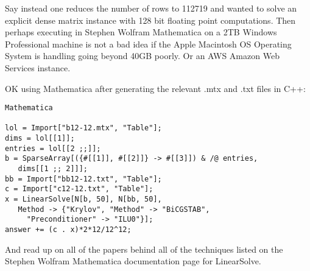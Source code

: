 Say instead one reduces the number of rows to 112719 and wanted to solve an explicit dense matrix instance with 128 bit floating point computations. Then perhaps executing in Stephen Wolfram Mathematica on a 2TB Windows Professional machine is not a bad idea if the Apple Macintosh OS Operating System is handling going beyond 40GB poorly. Or an AWS Amazon Web Services instance.

OK using Mathematica after generating the relevant .mtx and .txt files in C++:

\begin{verbatim}
Mathematica

lol = Import["b12-12.mtx", "Table"];
dims = lol[[1]];
entries = lol[[2 ;;]]; 
b = SparseArray[({#[[1]], #[[2]]} -> #[[3]]) & /@ entries, 
   dims[[1 ;; 2]]];
bb = Import["bb12-12.txt", "Table"];
c = Import["c12-12.txt", "Table"];
x = LinearSolve[N[b, 50], N[bb, 50], 
   Method -> {"Krylov", "Method" -> "BiCGSTAB", 
     "Preconditioner" -> "ILU0"}];
answer += (c . x)*2*12/12^12;
\end{verbatim}

And read up on all of the papers behind all of the techniques listed on the Stephen Wolfram Mathematica documentation page for LinearSolve.